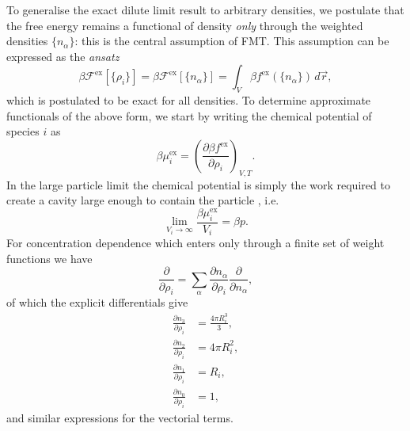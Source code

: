 To generalise the exact dilute limit result to arbitrary densities, we postulate that the free energy remains a functional of density \emph{only} through the weighted densities $\{n_\alpha\}$: this is the central assumption of FMT.
This assumption can be expressed as the \emph{ansatz}
\begin{equation}\label{eq:fmt-functional}
  \beta \mathcal{F}^\mathrm{ex}[\{\rho_i\}]
  =
  \beta \mathcal{F}^\mathrm{ex}[\{n_\alpha\}]
  =
  \int_V \beta f^\mathrm{ex}(\{n_\alpha\}) \, d\vec{r},
\end{equation}
which is postulated to be exact for all densities.
To determine approximate functionals of the above form, we start by writing the chemical potential of species $i$ as
\begin{equation}\label{eq:fmt-chemical-potential}
  \beta \mu_i^\mathrm{ex}
  =
  \left(
  \frac{\partial \beta f^\mathrm{ex}}{\partial \rho_i}
  \right)_{V,T}.
\end{equation}
In the large particle limit the chemical potential is simply the work required to create a cavity large enough to contain the particle%
,
i.e.\ \cite{RothJPCM2002,ReissJCP1960}
\begin{equation}\label{eq:fmt-chemical-potential-pressure}
  \lim_{V_i \to \infty} \frac{\beta \mu_i^\mathrm{ex}}{V_i} = \beta p.
\end{equation}
For concentration dependence which enters only through a finite set of weight functions we have
\begin{equation*}
  \frac{\partial}{\partial \rho_i}
  =
  \sum_\alpha
  \frac{\partial n_\alpha}{\partial \rho_i}
  \frac{\partial}{\partial n_\alpha},
\end{equation*}
of which the explicit differentials give
\begin{subequations}\label{eq:fmt-n-derivatives}
  \begin{align}
    \frac{\partial n_3}{\partial \rho_i}
    &=
    \frac{4 \pi R_i^3}{3},
    \\
    \frac{\partial n_2}{\partial \rho_i}
    &=
    4 \pi R_i^2,
    \\
    \frac{\partial n_1}{\partial \rho_i}
    &=
    R_i,
    \\
    \frac{\partial n_0}{\partial \rho_i}
    &=
    1,
  \end{align}
\end{subequations}
and similar expressions for the vectorial terms.
